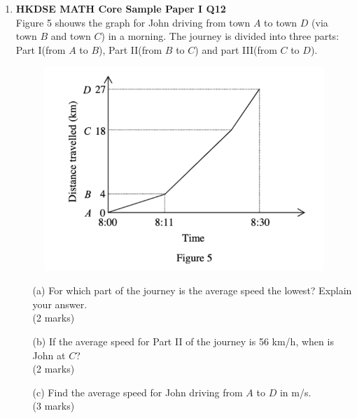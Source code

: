 \documentclass[12pt]{article}
\begin{document}
\begin{enumerate}
	\item \textbf{HKDSE MATH Core Sample Paper I Q12}\\
	Figure 5 shouws the graph for John driving from town $A$ to town $D$ (via town $B$ and town $C$) in a morning. The journey is divided into three parts: Part I(from $A$ to $B$), Part II(from $B$ to $C$) and part III(from $C$ to $D$).
	\begin{figure}[H]
		\centering
		\includegraphics[width = .5\linewidth]{SPFigure1.5}
	\end{figure}
	\begin{enumerate}
		\item[(a)] For which part of the journey is the average speed the lowest? Explain your answer. \\(2 marks)
		\item[(b)] If the average speed for Part II of the journey is 56 km/h, when is John at $C$? \\(2 marks)
		\item[(c)] Find the average speed for John driving from $A$ to $D$ in m/s. \\(3 marks)
	\end{enumerate}


\end{enumerate}
\end{document}

